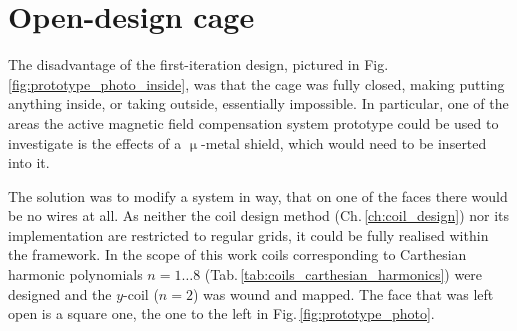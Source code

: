 \section{Open-design cage}
The disadvantage of the first-iteration design, pictured in Fig.\,\ref{fig:prototype_photo_inside}, was that the cage was fully closed, making putting anything inside, or taking outside, essentially impossible. In particular, one of the areas the active magnetic field compensation system prototype could be used to investigate is the effects of a $\upmu$-metal shield, which would need to be inserted into it.




The solution was to modify a system in way, that on one of the faces there would be no wires at all. As neither the coil design method (Ch.\,\ref{ch:coil_design}) nor its implementation are restricted to regular grids, it could be fully realised within the framework. In the scope of this work coils corresponding to Carthesian harmonic polynomials $n = 1 \ldots 8$ (Tab.\,\ref{tab:coils_carthesian_harmonics}) were designed and the $y$-coil ($n = 2$) was wound and mapped. The face that was left open is a square one, the one to the left in Fig.\,\ref{fig:prototype_photo}.

